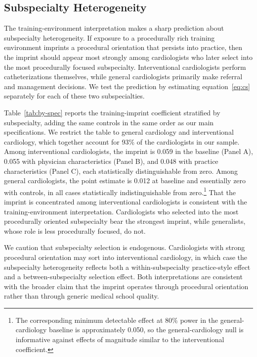 \documentclass[12pt]{article}
\begin{document}
\subsection{Subspecialty Heterogeneity}\label{sec:imprint-spec}

The training-environment interpretation makes a sharp prediction about subspecialty heterogeneity. If exposure to a procedurally rich training environment imprints a procedural orientation that persists into practice, then the imprint should appear most strongly among cardiologists who later select into the most procedurally focused subspecialty. Interventional cardiologists perform catheterizations themselves, while general cardiologists primarily make referral and management decisions. We test the prediction by estimating equation~\eqref{eq:cs} separately for each of these two subspecialties.

Table~\ref{tab:by-spec} reports the training-imprint coefficient stratified by subspecialty, adding the same controls in the same order as our main specifications. We restrict the table to general cardiology and interventional cardiology, which together account for 93\% of the cardiologists in our sample. Among interventional cardiologists, the imprint is 0.059 in the baseline (Panel A), 0.055 with physician characteristics (Panel B), and 0.048 with practice characteristics (Panel C), each statistically distinguishable from zero. Among general cardiologists, the point estimate is 0.012 at baseline and essentially zero with controls, in all cases statistically indistinguishable from zero.\footnote{The corresponding minimum detectable effect at 80\% power in the general-cardiology baseline is approximately 0.050, so the general-cardiology null is informative against effects of magnitude similar to the interventional coefficient.} That the imprint is concentrated among interventional cardiologists is consistent with the training-environment interpretation. Cardiologists who selected into the most procedurally oriented subspecialty bear the strongest imprint, while generalists, whose role is less procedurally focused, do not.

We caution that subspecialty selection is endogenous. Cardiologists with strong procedural orientation may sort into interventional cardiology, in which case the subspecialty heterogeneity reflects both a within-subspecialty practice-style effect and a between-subspecialty selection effect. Both interpretations are consistent with the broader claim that the imprint operates through procedural orientation rather than through generic medical school quality.
\end{document}
